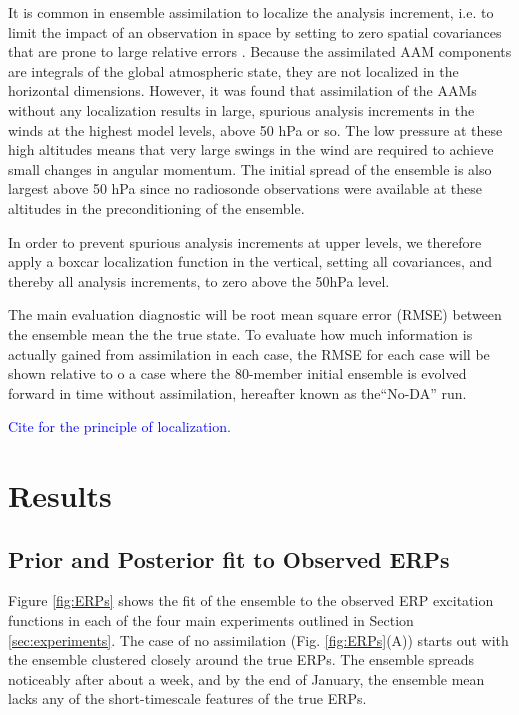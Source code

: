 \documentclass[draft,jgrga]{agutex}
\begin{document}
\begin{article}
It is common in ensemble assimilation to localize the analysis increment, i.e. to limit the impact of an observation in space by setting to zero spatial covariances that are prone to large relative errors \cite{houtekamermitchell1998}.
Because the assimilated AAM components are integrals of the global atmospheric state, they are not localized in the horizontal dimensions.
However, it was found that assimilation of the AAMs without any localization results in large, spurious  analysis increments in the winds at the highest model levels, above 50 hPa or so.
The low pressure at these high altitudes means that very large swings in the wind are required to achieve small changes in angular momentum.
The initial spread of the ensemble is also largest above 50 hPa since no radiosonde observations were available at these altitudes in the preconditioning of the ensemble.

In order to prevent spurious analysis increments at upper levels, we therefore apply a boxcar localization function in the vertical, setting all covariances, and thereby all analysis increments, to zero above the 50hPa level.

The main evaluation diagnostic will be root mean square error (RMSE) between the ensemble mean the the true state.
To evaluate how much information is actually gained from assimilation in each case, the RMSE for each case will be shown relative to o a case where the 80-member initial ensemble is evolved forward in time without assimilation, hereafter known as the``No-DA'' run.


\textcolor{blue}{Cite  for the principle of localization.}




\section{Results}

\subsection{Prior and Posterior fit to Observed ERPs}
Figure \ref{fig:ERPs} shows the fit of the ensemble to the observed ERP excitation functions in each of the four main experiments outlined in Section \ref{sec:experiments}.
The case of no assimilation (Fig. \ref{fig:ERPs}(A)) starts out with the ensemble clustered closely around the true ERPs.
The ensemble spreads noticeably after about a week, and by the end of January, the ensemble mean lacks any of the short-timescale features of the true ERPs.


\end{article}
\end{document}
